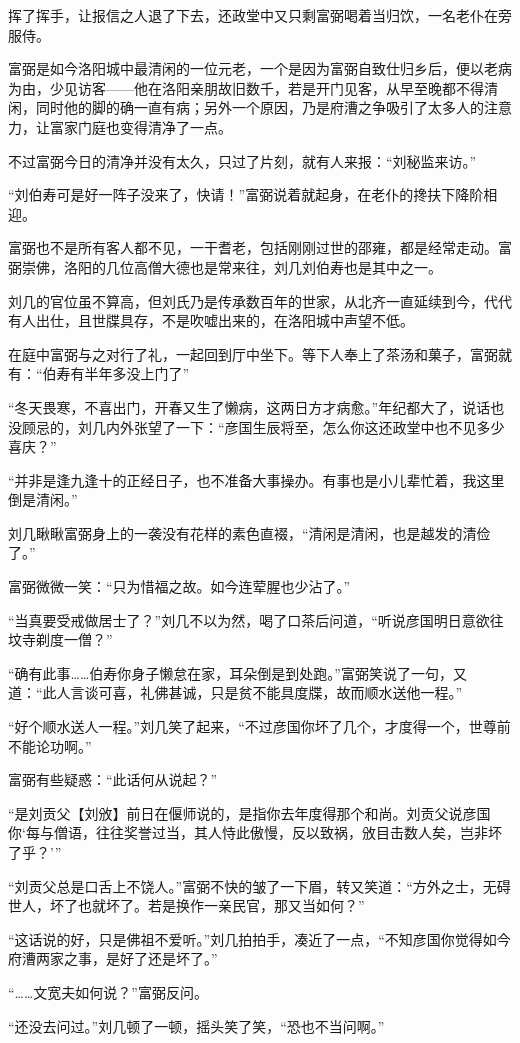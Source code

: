 挥了挥手，让报信之人退了下去，还政堂中又只剩富弼喝着当归饮，一名老仆在旁服侍。

富弼是如今洛阳城中最清闲的一位元老，一个是因为富弼自致仕归乡后，便以老病为由，少见访客——他在洛阳亲朋故旧数千，若是开门见客，从早至晚都不得清闲，同时他的脚的确一直有病；另外一个原因，乃是府漕之争吸引了太多人的注意力，让富家门庭也变得清净了一点。

不过富弼今日的清净并没有太久，只过了片刻，就有人来报：“刘秘监来访。”

“刘伯寿可是好一阵子没来了，快请！”富弼说着就起身，在老仆的搀扶下降阶相迎。

富弼也不是所有客人都不见，一干耆老，包括刚刚过世的邵雍，都是经常走动。富弼崇佛，洛阳的几位高僧大德也是常来往，刘几刘伯寿也是其中之一。

刘几的官位虽不算高，但刘氏乃是传承数百年的世家，从北齐一直延续到今，代代有人出仕，且世牒具存，不是吹嘘出来的，在洛阳城中声望不低。

在庭中富弼与之对行了礼，一起回到厅中坐下。等下人奉上了茶汤和菓子，富弼就有：“伯寿有半年多没上门了”

“冬天畏寒，不喜出门，开春又生了懒病，这两日方才病愈。”年纪都大了，说话也没顾忌的，刘几内外张望了一下：“彦国生辰将至，怎么你这还政堂中也不见多少喜庆？”

“并非是逢九逢十的正经日子，也不准备大事操办。有事也是小儿辈忙着，我这里倒是清闲。”

刘几瞅瞅富弼身上的一袭没有花样的素色直裰，“清闲是清闲，也是越发的清俭了。”

富弼微微一笑：“只为惜福之故。如今连荤腥也少沾了。”

“当真要受戒做居士了？”刘几不以为然，喝了口茶后问道，“听说彦国明日意欲往坟寺剃度一僧？”

“确有此事……伯寿你身子懒怠在家，耳朵倒是到处跑。”富弼笑说了一句，又道：“此人言谈可喜，礼佛甚诚，只是贫不能具度牒，故而顺水送他一程。”

“好个顺水送人一程。”刘几笑了起来，“不过彦国你坏了几个，才度得一个，世尊前不能论功啊。”

富弼有些疑惑：“此话何从说起？”

“是刘贡父【刘攽】前日在偃师说的，是指你去年度得那个和尚。刘贡父说彦国你‘每与僧语，往往奖誉过当，其人恃此傲慢，反以致祸，攽目击数人矣，岂非坏了乎？’”

“刘贡父总是口舌上不饶人。”富弼不快的皱了一下眉，转又笑道：“方外之士，无碍世人，坏了也就坏了。若是换作一亲民官，那又当如何？”

“这话说的好，只是佛祖不爱听。”刘几拍拍手，凑近了一点，“不知彦国你觉得如今府漕两家之事，是好了还是坏了。”

“……文宽夫如何说？”富弼反问。

“还没去问过。”刘几顿了一顿，摇头笑了笑，“恐也不当问啊。”

